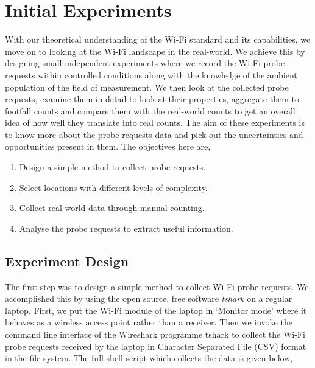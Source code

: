 \section{Initial Experiments}\label{section:intial:experiments}

With our theoretical understanding of the Wi-Fi standard and its capabilities, we move on to looking at the Wi-Fi landscape in the real-world.
We achieve this by designing small independent experiments where we record the Wi-Fi probe requests within controlled conditions along with the knowledge of the ambient population of the field of measurement. 
We then look at the collected probe requests, examine them in detail to look at their properties, aggregate them to footfall counts and compare them with the real-world counts to get an overall idea of how well they translate into real counts.
The aim of these experiments is to know more about the probe requests data and pick out the uncertainties and opportunities present in them.
The objectives here are,

\begin{enumerate}[leftmargin = 2em, rightmargin=2em]
  \itemsep-0.25em
  \item Design a simple method to collect probe requests.
  \item Select locations with different levels of complexity.
  \item Collect real-world data through manual counting.
  \item Analyse the probe requests to extract useful information.
\end{enumerate}

\subsection{Experiment Design}

The first step was to design a simple method to collect Wi-Fi probe requests.
We accomplished this by using the open source, free software \textit{tshark} \cite{wireshark2} on a regular laptop.
First, we put the Wi-Fi module of the laptop in `Monitor mode' where it behaves as a wireless access point rather than a receiver.
Then we invoke the command line interface of the Wireshark programme tshark to collect the Wi-Fi probe requests received by the laptop in Character Separated File (CSV) format in the file system. 
The full shell script which collects the data is given below,

